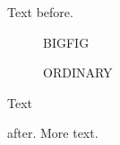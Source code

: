 \documentclass{memoir}
\begin{document}
Text before.
\begin{figure}[p]\centering BIGFIG\caption{ORDINARY}\end{figure}
Text \begin{marginfigure}\caption{MARGINAL}\end{marginfigure} after.
\clearpage
More text.
\end{document}

